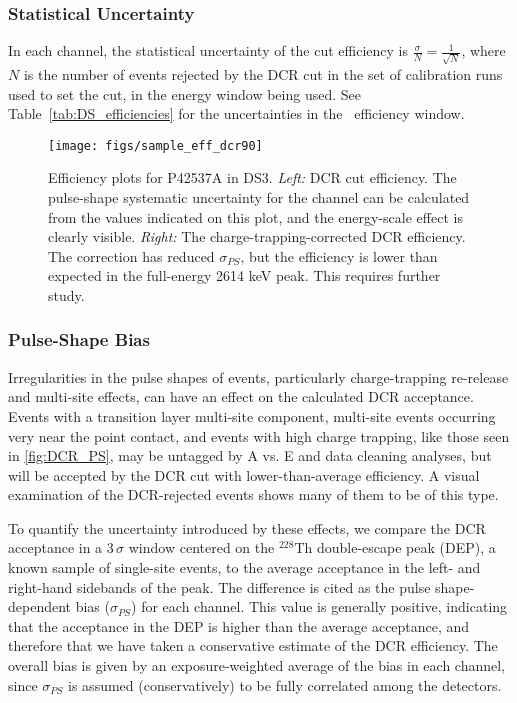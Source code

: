 \documentclass[groupedaddress,rmp,amsmath,amssymb,bibnotes,altaffilletter,twocolumn]{revtex4-1}
\begin{document}
\subsubsection{Statistical Uncertainty}
In each channel, the statistical uncertainty of the cut efficiency is $\frac{\sigma}{N} = \frac{1}{\sqrt{N}}$, where $N$ is the number of events rejected by the DCR cut in the set of calibration runs used to set the cut, in the energy window being used. See Table~\ref{tab:DS_efficiencies} for the uncertainties in the \nonubb\ efficiency window.

\begin{figure*}[t]
 \centering
 \texttt{[image: figs/sample\_eff\_dcr90]}
 \caption{Efficiency plots for P42537A in DS3. {\it Left:} DCR cut efficiency. The pulse-shape systematic uncertainty for the channel can be calculated from the values indicated on this plot, and the energy-scale effect is clearly visible. {\it Right:} The charge-trapping-corrected DCR efficiency. The correction has reduced $\sigma_{PS}$, but the efficiency is lower than expected in the full-energy 2614 keV peak. This requires further study.} 
 \label{fig:singleCh_eff}
\end{figure*}

\subsubsection{Pulse-Shape Bias}
Irregularities in the pulse shapes of events, particularly charge-trapping re-release and multi-site effects, can have an effect on the calculated DCR acceptance. Events with a transition layer multi-site component, multi-site events occurring very near the point contact, and events with high charge trapping, like those seen in \ref{fig:DCR_PS}, may be untagged by A vs. E and data cleaning analyses, but will be accepted by the DCR cut with lower-than-average efficiency. A visual examination of the DCR-rejected events shows many of them to be of this type.

To quantify the uncertainty introduced by these effects, we compare the DCR acceptance in a 3\,$\sigma$ window centered on the $^{228}$Th double-escape peak (DEP), a known sample of single-site events, to the average acceptance in the left- and right-hand sidebands of the peak. The difference is cited as the pulse shape-dependent bias ($\sigma_{PS}$) for each channel. This value is generally positive, indicating that the acceptance in the DEP is higher than the average acceptance, and therefore that we have taken a conservative estimate of the DCR efficiency. The overall bias is given by an exposure-weighted average of the bias in each channel, since $\sigma_{PS}$ is assumed (conservatively) to be fully correlated among the detectors. 
\end{document}
